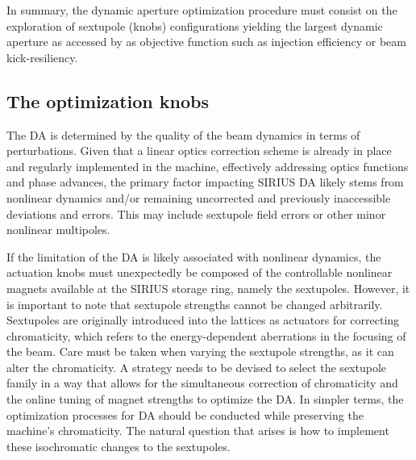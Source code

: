 
In summary, the dynamic aperture optimization procedure must consist on the exploration of sextupole (knobs) configurations yielding the largest dynamic aperture as accessed by as objective function such as injection efficiency or beam kick-resiliency.

\subsection{The optimization knobs}

The DA is determined by the quality of the beam dynamics in terms of perturbations. Given that a linear optics correction scheme is already in place and regularly implemented in the machine, effectively addressing optics functions and phase advances, the primary factor impacting SIRIUS DA likely stems from nonlinear dynamics and/or remaining uncorrected and previously inaccessible deviations and errors. This may include sextupole field errors or other minor nonlinear multipoles.

If the limitation of the DA is likely associated with nonlinear dynamics, the actuation knobs must unexpectedly be composed of the controllable nonlinear magnets available at the SIRIUS storage ring, namely the sextupoles. However, it is important to note that sextupole strengths cannot be changed arbitrarily. Sextupoles are originally introduced into the lattices as actuators for correcting chromaticity, which refers to the energy-dependent aberrations in the focusing of the beam. Care must be taken when varying the sextupole strengths, as it can alter the chromaticity. A strategy needs to be devised to select the sextupole family in a way that allows for the simultaneous correction of chromaticity and the online tuning of magnet strengths to optimize the DA. In simpler terms, the optimization processes for DA should be conducted while preserving the machine's chromaticity. The natural question that arises is how to implement these isochromatic changes to the sextupoles.


